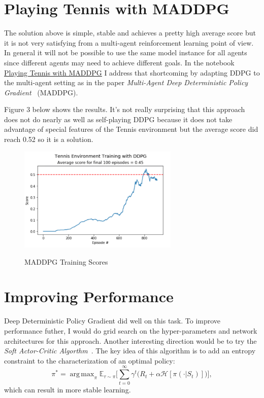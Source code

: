 \documentclass[sigchi]{acmart}
\begin{document}
\section{Playing Tennis with MADDPG}
The solution above is simple, stable and achieves a pretty high average score but it is not very satisfying from a multi-agent reinforcement learning point of view.  In general it will not be possible to use the same model instance for all agents since different agents may need to achieve different goals.
In the notebook
\href{https://nbviewer.jupyter.org/github/bobflagg/Collaboration-and-Competition/blob/master/02-Playing-Tennis-with-MADDPG.ipynb}{\underline{Playing Tennis with MADDPG}}
 I address that shortcoming by adapting DDPG to the multi-agent setting as in the paper {\em Multi-Agent Deep Deterministic Policy Gradient}~\cite{DBLP:journals/corr/LoweWTHAM17} (MADDPG). 

Figure 3 below shows the results.  It's not really surprising that this approach does not do nearly as well as self-playing DDPG because it does not take advantage of special features of the Tennis environment but the average score did reach 0.52 so it is a solution.

\begin{figure}[h]
	\centering
	\includegraphics[width=3.0in]{ma-scores}
	\label{fig:ddpg-scores}
	\caption{MADDPG Training Scores}
\end{figure}


\section{Improving Performance}

Deep Deterministic Policy Gradient did well on this task.  To improve performance futher, I would do grid search on the hyper-parameters and network architectures for this approach.  Another interesting direction would be to try the {\em Soft Actor-Critic Algorthm}~\cite{DBLP:journals/corr/abs-1812-05905}.  The key idea 
of this algorithm is to add an entropy constraint to the characterization of an optimal policy:
	$$\pi^* =  \operatorname{arg\,max}_{\pi}\mathbb{E}_{\tau\sim\pi}\big[\sum_{t=0}^{\infty}\gamma^t\big(R_t+\alpha \mathcal{H} [\pi(\cdot|S_t)]\big)\big],$$
which can result in more stable learning.



\end{document}
